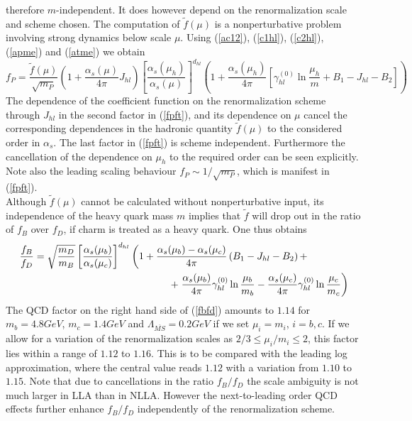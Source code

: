 therefore $m$-independent. It does however depend on the 
renormalization scale and scheme chosen. The computation of
$\tilde f(\mu)$ is a nonperturbative problem involving strong dynamics
below scale $\mu$. Using (\ref{ac12}), (\ref{c1hl}), (\ref{c2hl}),
(\ref{apme}) and (\ref{atme}) we obtain
\begin{equation}\label{fpft}
f_P=\frac{\tilde f(\mu)}{\sqrt{m_P}}\left(1+\frac{\alpha_s(\mu)}{4\pi}J_{hl}
\right)\left[\frac{\alpha_s(\mu_h)}{\alpha_s(\mu)}\right]^{d_{hl}}
\left(1+\frac{\alpha_s(\mu_h)}{4\pi}
\left[\gamma^{(0)}_{hl}\ln\frac{\mu_h}{m}+B_1-J_{hl}-B_2\right]\right)
\end{equation}
The dependence of the coefficient function on the renormalization scheme
through $J_{hl}$ in the second factor in (\ref{fpft}), and its dependence on
$\mu$ cancel the corresponding dependences in the hadronic quantity
$\tilde f(\mu)$ to the considered order in $\alpha_s$. The last factor
in (\ref{fpft}) is scheme independent. Furthermore the cancellation of
the dependence on $\mu_h$ to the required order can be seen explicitly.
Note also the leading scaling behaviour $f_P\sim 1/\sqrt{m_P}$, which
is manifest in (\ref{fpft}).
\\
Although $\tilde f(\mu)$ cannot be calculated without nonperturbative
input, its independence of the heavy quark mass $m$ implies that $\tilde f$
will drop out in the ratio of $f_B$ over $f_D$, if charm is treated as
a heavy quark. One thus obtains
\begin{eqnarray}\label{fbfd}
\lefteqn{\frac{f_B}{f_D} = \sqrt{\frac{m_D}{m_B}}
\left[\frac{\alpha_s(\mu_b)}{\alpha_s(\mu_c)}\right]^{d_{hl}}
 \left( 1 +\frac{\alpha_s(\mu_b)-\alpha_s(\mu_c)}{4\pi}
\left(B_1-J_{hl}-B_2\right)+ \right.} \hspace{2cm} \nonumber\\
& & \hspace{3cm} + \left. \frac{\alpha_s(\mu_b)}{4\pi}
\gamma^{(0)}_{hl}\ln\frac{\mu_b}{m_b}-\frac{\alpha_s(\mu_c)}{4\pi}
\gamma^{(0)}_{hl}\ln\frac{\mu_c}{m_c}\right) 
\end{eqnarray}
The QCD factor on the right hand side of (\ref{fbfd}) amounts to $1.14$
for $m_b=4.8 GeV$, $m_c=1.4GeV$ and $\Lambda_{\overline{MS}}=0.2 GeV$
if we set $\mu_i=m_i$, $i=b,c$. If we allow for a variation of the
renormalization scales as $2/3\leq\mu_i/m_i\leq 2$, this factor lies
within a range of $1.12$ to $1.16$. This is to be compared with the
leading log approximation, where the central value reads $1.12$ with a
variation from $1.10$ to $1.15$. Note that due to cancellations in the
ratio $f_B/f_D$ the scale ambiguity is not much larger in LLA than in
NLLA. However the next-to-leading order QCD effects further enhance
$f_B/f_D$ independently of the renormalization scheme. 

